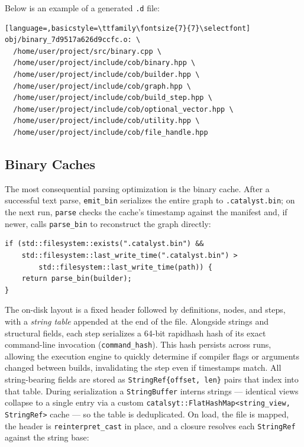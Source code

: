 \documentclass[11pt]{article}
\begin{document}
Below is an example of a generated \texttt{.d} file:

\begin{lstlisting}[language=,basicstyle=\ttfamily\fontsize{7}{7}\selectfont]
obj/binary_7d9517a626d9ccfc.o: \
  /home/user/project/src/binary.cpp \
  /home/user/project/include/cob/binary.hpp \
  /home/user/project/include/cob/builder.hpp \
  /home/user/project/include/cob/graph.hpp \
  /home/user/project/include/cob/build_step.hpp \
  /home/user/project/include/cob/optional_vector.hpp \
  /home/user/project/include/cob/utility.hpp \
  /home/user/project/include/cob/file_handle.hpp
\end{lstlisting}

\subsection{Binary Caches}

The most consequential parsing optimization is the binary cache. After a
successful text parse, \lstinline|emit_bin| serializes the entire graph to
\texttt{.catalyst.bin}; on the next run, \lstinline|parse| checks the cache's
timestamp against the manifest and, if newer, calls \lstinline|parse_bin| to
reconstruct the graph directly:

\begin{lstlisting}
if (std::filesystem::exists(".catalyst.bin") &&
    std::filesystem::last_write_time(".catalyst.bin") >
        std::filesystem::last_write_time(path)) {
    return parse_bin(builder);
}
\end{lstlisting}

The on-disk layout is a fixed header followed by definitions, nodes, and steps,
with a \emph{string table} appended at the end of the file. Alongside strings and structural fields, each step serializes a 64-bit rapidhash hash of its exact command-line invocation (\lstinline|command_hash|). This hash persists across runs, allowing the execution engine to quickly determine if compiler flags or arguments changed between builds, invalidating the step even if timestamps match. All string-bearing
fields are stored as \lstinline|StringRef{offset, len}| pairs that index into
that table. During serialization a \lstinline|StringBuffer| interns strings ---
identical views collapse to a single entry via a custom
\lstinline|catalsyt::FlatHashMap<string_view, StringRef>| cache --- so the table is
deduplicated. On load, the file is mapped, the header is
\lstinline|reinterpret_cast| in place, and a closure resolves each
\lstinline|StringRef| against the string base:
\end{document}

